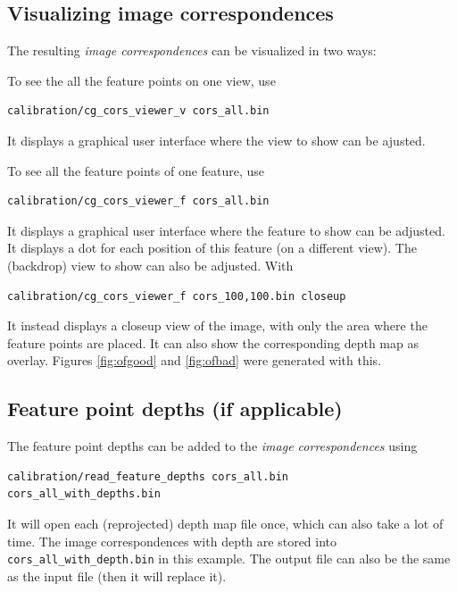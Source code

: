 \documentclass{scrreprt}
\begin{document}
\subsection{Visualizing image correspondences}
The resulting \emph{image correspondences} can be visualized in two ways:

To see the all the feature points on one view, use
\begin{lstlisting}[language=bash]
calibration/cg_cors_viewer_v cors_all.bin
\end{lstlisting}
It displays a graphical user interface where the view to show can be ajusted.

To see all the feature points of one feature, use
\begin{lstlisting}[language=bash]
calibration/cg_cors_viewer_f cors_all.bin 
\end{lstlisting}
It displays a graphical user interface where the feature to show can be adjusted. It displays a dot for each position of this feature (on a different view). The (backdrop) view to show can also be adjusted. With
\begin{lstlisting}[language=bash]
calibration/cg_cors_viewer_f cors_100,100.bin closeup
\end{lstlisting}
It instead displays a closeup view of the image, with only the area where the feature points are placed. It can also show the corresponding depth map as overlay. Figures \ref{fig:ofgood} and \ref{fig:ofbad} were generated with this.



\subsection{Feature point depths (if applicable)}
The feature point depths can be added to the \emph{image correspondences} using
\begin{lstlisting}[language=bash]
calibration/read_feature_depths cors_all.bin
cors_all_with_depths.bin
\end{lstlisting}
It will open each (reprojected) depth map file once, which can also take a lot of time. The image correspondences with depth are stored into \texttt{cors\_all\_with\_depth.bin} in this example. The output file can also be the same as the input file (then it will replace it).
\end{document}
